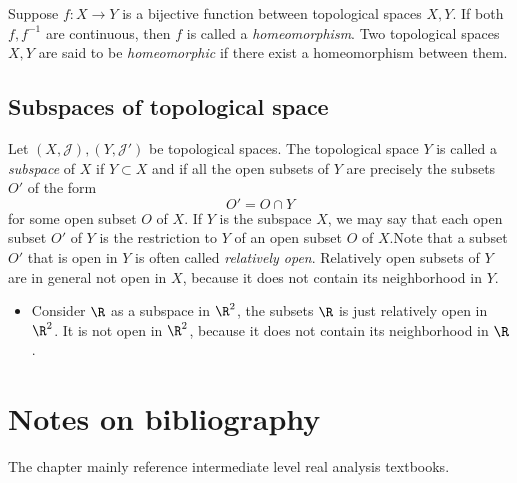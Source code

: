 \begin{refsection}
 \begin{definition}[homemorphism]
 Suppose $f: X\rightarrow Y$ is a bijective function between topological spaces $X,Y$. If both $f,f^{-1}$ are continuous, then $f$ is called a \emph{homeomorphism}. Two topological spaces $X,Y$ are said to be \emph{homeomorphic} if there exist a homeomorphism between them.
 \end{definition}



\subsection{Subspaces of topological space}
\begin{definition}
\cite{Mendelson}Let $(X,\mathcal{J}), (Y,\mathcal{J}')$ be topological spaces. The topological space $Y$ is called a \emph{subspace} of $X$ if $Y\subset X$ and if all the open subsets of $Y$ are precisely the subsets $O'$ of the form
$$O' = O \cap Y$$ for some open subset $O$ of $X$. If $Y$ is the subspace $X$, we may say that each open subset $O'$ of $Y$ is the restriction to $Y$ of an open subset $O$ of $X$.Note that a subset $O'$ that is open in $Y$ is often called \emph{relatively open}. Relatively open subsets of $Y$ are in general not open in $X$, because it does not contain its neighborhood in $Y$.
\end{definition}

\begin{example}\hfill
\begin{itemize}
    \item Consider $\R$ as a subspace in $\R^2$, the subsets $\R$ is just relatively open in $\R^2$. It is not open in $\R^2$, because it does not contain its neighborhood in $\R$.
\end{itemize}
\end{example}


\section{Notes on bibliography}
The chapter mainly reference intermediate level real analysis textbooks\cite{johnsonbaugh2010foundations}\cite{abbott2001understanding}\cite{thomson2001elementary}\cite{strichartz2000way}.
\cite{duren2012invitation}
\printbibliography

\end{refsection}

